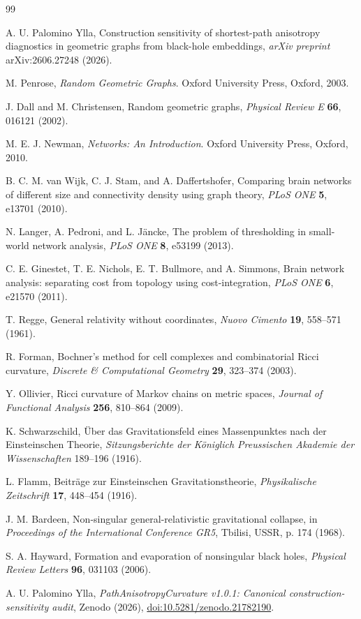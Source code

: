 \documentclass[11pt]{article}
\begin{document}
\begin{thebibliography}{99}

A. U. Palomino Ylla,
Construction sensitivity of shortest-path anisotropy diagnostics in geometric
graphs from black-hole embeddings,
\emph{arXiv preprint} arXiv:2606.27248 (2026).

M. Penrose,
\emph{Random Geometric Graphs}.
Oxford University Press, Oxford, 2003.

J. Dall and M. Christensen,
Random geometric graphs,
\emph{Physical Review E} \textbf{66}, 016121 (2002).

M. E. J. Newman,
\emph{Networks: An Introduction}.
Oxford University Press, Oxford, 2010.

B. C. M. van Wijk, C. J. Stam, and A. Daffertshofer,
Comparing brain networks of different size and connectivity density using graph
theory,
\emph{PLoS ONE} \textbf{5}, e13701 (2010).

N. Langer, A. Pedroni, and L. J{\"a}ncke,
The problem of thresholding in small-world network analysis,
\emph{PLoS ONE} \textbf{8}, e53199 (2013).

C. E. Ginestet, T. E. Nichols, E. T. Bullmore, and A. Simmons,
Brain network analysis: separating cost from topology using cost-integration,
\emph{PLoS ONE} \textbf{6}, e21570 (2011).

T. Regge,
General relativity without coordinates,
\emph{Nuovo Cimento} \textbf{19}, 558--571 (1961).

R. Forman,
Bochner's method for cell complexes and combinatorial Ricci curvature,
\emph{Discrete \& Computational Geometry} \textbf{29}, 323--374 (2003).

Y. Ollivier,
Ricci curvature of Markov chains on metric spaces,
\emph{Journal of Functional Analysis} \textbf{256}, 810--864 (2009).

K. Schwarzschild,
{\"U}ber das Gravitationsfeld eines Massenpunktes nach der Einsteinschen Theorie,
\emph{Sitzungsberichte der K{\"o}niglich Preussischen Akademie der Wissenschaften}
189--196 (1916).

L. Flamm,
Beitr{\"a}ge zur Einsteinschen Gravitationstheorie,
\emph{Physikalische Zeitschrift} \textbf{17}, 448--454 (1916).

J. M. Bardeen,
Non-singular general-relativistic gravitational collapse,
in \emph{Proceedings of the International Conference GR5}, Tbilisi, USSR, p. 174
(1968).

S. A. Hayward,
Formation and evaporation of nonsingular black holes,
\emph{Physical Review Letters} \textbf{96}, 031103 (2006).

\raggedright
A. U. Palomino Ylla,
\emph{PathAnisotropyCurvature v1.0.1: Canonical construction-sensitivity audit},
Zenodo (2026),
\href{https://doi.org/10.5281/zenodo.21782190}{doi:10.5281/zenodo.21782190}.

\end{thebibliography}
\end{document}
